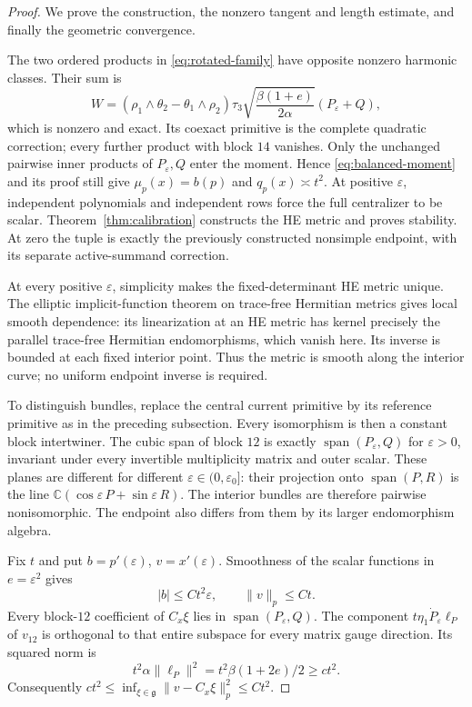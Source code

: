 \documentclass[11pt]{amsart}
\theoremstyle{definition}
\theoremstyle{remark}
\newcommand{\CC}{\mathbb C}
\begin{document}
\begin{proof}
We prove the construction, the nonzero tangent and length estimate,
and finally the geometric convergence.

The two ordered products in \eqref{eq:rotated-family} have opposite
nonzero harmonic classes. Their sum is
\[
 W=(\rho_1\wedge\theta_2-\theta_1\wedge\rho_2)\tau_3
       \sqrt{\frac{\beta(1+e)}{2\alpha}}(P_\varepsilon+Q),
\]
which is nonzero and exact. Its coexact primitive is the complete
quadratic correction; every further product with block $14$ vanishes.
Only the unchanged pairwise inner products of $P_\varepsilon,Q$
enter the moment. Hence \eqref{eq:balanced-moment} and its proof
still give $\mu_p(x)=b(p)$ and $q_p(x)\asymp t^2$.
At positive $\varepsilon$, independent polynomials and independent
rows force the full centralizer to be scalar. Theorem~\ref{thm:calibration}
constructs the HE metric and proves stability. At zero the tuple is
exactly the previously constructed nonsimple endpoint, with its
separate active-summand correction.

At every positive $\varepsilon$, simplicity makes the fixed-determinant
HE metric unique. The elliptic implicit-function theorem on trace-free
Hermitian metrics gives local smooth dependence: its linearization at
an HE metric has kernel precisely the parallel trace-free Hermitian
endomorphisms, which vanish here. Its inverse is bounded at each
fixed interior point. Thus the metric is smooth along the interior
curve; no uniform endpoint inverse is required.

To distinguish bundles, replace the central current primitive by its
reference primitive as in the preceding subsection. Every isomorphism
is then a constant block intertwiner. The cubic span of block $12$ is
exactly $\operatorname{span}(P_\varepsilon,Q)$ for $\varepsilon>0$,
invariant under every
invertible multiplicity matrix and outer scalar. These planes are
different for different $\varepsilon\in(0,\varepsilon_0]$: their
projection onto $\operatorname{span}(P,R)$ is the line
$\CC(\cos\varepsilon\,P+\sin\varepsilon\,R)$.
The interior bundles are therefore pairwise nonisomorphic. The endpoint
also differs from them by its larger endomorphism algebra.

Fix $t$ and put $b=p'(\varepsilon)$, $v=x'(\varepsilon)$.
Smoothness of the scalar functions in $e=\varepsilon^2$ gives
\begin{equation}\label{eq:curve-velocities}
 |b|\le Ct^2\varepsilon,\qquad \|v\|_p\le Ct.
\end{equation}
Every block-$12$ coefficient of $C_x\xi$ lies in
$\operatorname{span}(P_\varepsilon,Q)$. The component
$t\eta_1\dot P_\varepsilon\ell_P$ of $v_{12}$ is orthogonal to
that entire subspace for every matrix gauge direction. Its squared
norm is
\begin{equation}\label{eq:curve-transverse-energy}
 t^2\alpha\|\ell_P\|^2=t^2\beta(1+2e)/2\ge ct^2.
\end{equation}
Consequently
$ct^2\le\inf_{\xi\in\mathfrak g}\|v-C_x\xi\|_p^2\le Ct^2$.


\end{proof}
\end{document}
